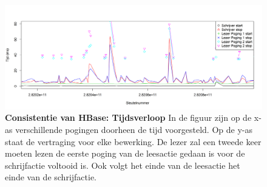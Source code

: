 \begin{figure}[b] 
	\centering
	\includegraphics[width=\textwidth]{img/Observaties/HBase/consistency-plot-R-1-insertRawData-5}

	\caption{\textbf{Consistentie van HBase: Tijdsverloop} \newline
 	In de figuur zijn op de x-as verschillende pogingen doorheen de tijd voorgesteld. Op de y-as staat de vertraging voor elke bewerking. De lezer zal een tweede keer moeten lezen de eerste poging van de leesactie gedaan is voor de schrijfactie voltooid is. Ook volgt het einde van de leesactie het einde van de schrijfactie. }
	\label{fig:consistentie-hbase-tijdschaal-lezer-1}
\end{figure}


